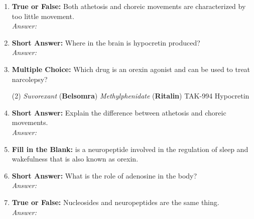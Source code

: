 \begin{enumerate}[label=\textbf{Q3.5.\arabic*}]
    \item \textbf{True or False:} Both athetosis and choreic movements are characterized by too little movement. \\
        \textit{Answer:} %

    \item \textbf{Short Answer:} Where in the brain is hypocretin produced? \\
        \textit{Answer:} \\%

    \item \textbf{Multiple Choice:} Which drug is an orexin agonist and can be used to treat narcolepsy?
        \begin{tasks}[label=\textcolor{\documentTheme}{(\Alph*)}, item-format=\color{\documentTheme}, label-width=1.5em, item-indent=1.7em](2)
            \task \textit{Suvorexant} (\textbf{Belsomra})
            \task \textit{Methylphenidate} (\textbf{Ritalin})
            \task TAK-994
            \task Hypocretin
        \end{tasks}

    \item \textbf{Short Answer:} Explain the difference between athetosis and choreic movements. \\
        \textit{Answer:} \\%

    \item \textbf{Fill in the Blank:} \underline{\hspace{3cm}} is a neuropeptide involved in the regulation of sleep and wakefulness that is also known as orexin.

    \item \textbf{Short Answer:} What is the role of adenosine in the body? \\
        \textit{Answer:} \\%

    \item \textbf{True or False:} Nucleosides and neuropeptides are the same thing. \\
        \textit{Answer:} %


\end{enumerate}
